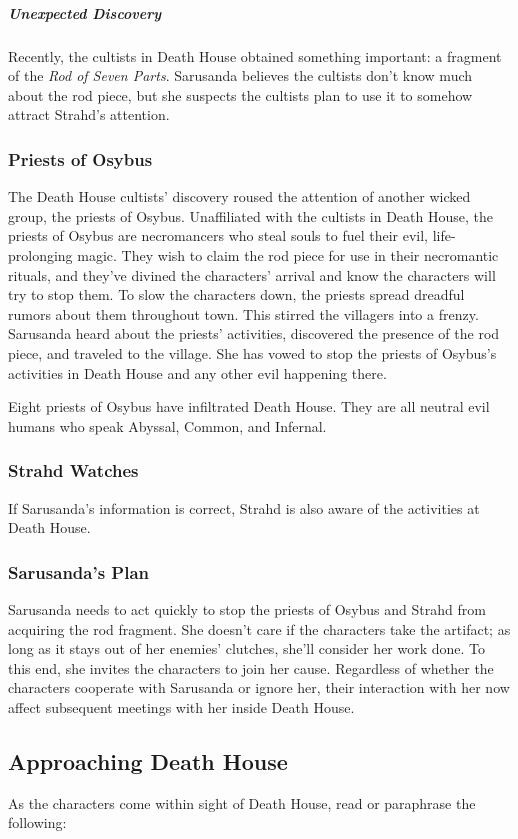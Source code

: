 \documentclass[10pt,a4paper,twoside,bg=print,twocolumn,openany,nodeprecatedcode]{dndbook}
\begin{document}
\subparagraph{Unexpected Discovery}
Recently, the cultists in Death House obtained something important: a fragment of the \textit{Rod of Seven Parts}. Sarusanda believes the cultists don't know much about the rod piece, but she suspects the cultists plan to use it to somehow attract Strahd's attention.

\subsubsection{Priests of Osybus}
The Death House cultists' discovery roused the attention of another wicked group, the priests of Osybus. Unaffiliated with the cultists in Death House, the priests of Osybus are necromancers who steal souls to fuel their evil, life-prolonging magic. They wish to claim the rod piece for use in their necromantic rituals, and they've divined the characters' arrival and know the characters will try to stop them. To slow the characters down, the priests spread dreadful rumors about them throughout town. This stirred the villagers into a frenzy. Sarusanda heard about the priests' activities, discovered the presence of the rod piece, and traveled to the village. She has vowed to stop the priests of Osybus's activities in Death House and any other evil happening there.

Eight priests of Osybus have infiltrated Death House. They are all neutral evil humans who speak Abyssal, Common, and Infernal.

\subsubsection{Strahd Watches}
If Sarusanda's information is correct, Strahd is also aware of the activities at Death House.

\subsubsection{Sarusanda's Plan}
Sarusanda needs to act quickly to stop the priests of Osybus and Strahd from acquiring the rod fragment. She doesn't care if the characters take the artifact; as long as it stays out of her enemies' clutches, she'll consider her work done. To this end, she invites the characters to join her cause. Regardless of whether the characters cooperate with Sarusanda or ignore her, their interaction with her now affect subsequent meetings with her inside Death House.

\subsection{Approaching Death House}
As the characters come within sight of Death House, read or paraphrase the following:
\end{document}
